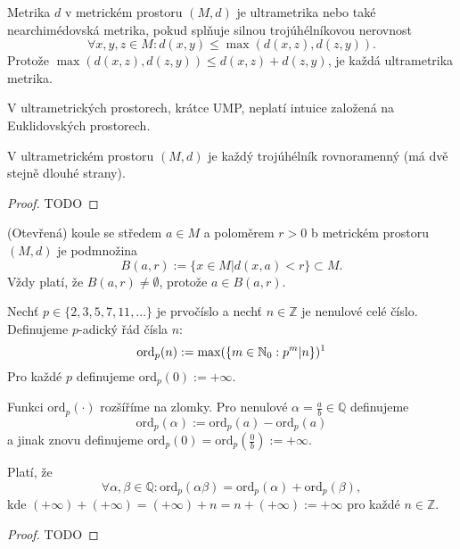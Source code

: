 \documentclass[../main.tex]{subfiles}
\begin{document}
\begin{definition}[Ultrametrika]
    Metrika $d$ v metrickém prostoru $(M,d)$ je ultrametrika nebo také nearchimédovská metrika, pokud
    splňuje silnou trojúhélníkovou nerovnost
    \[ \forall x,y,z \in M: d(x,y) \leq \max(d(x,z), d(z,y)). \]
    Protože $\max(d(x,z),d(z,y)) \leq d(x,z) + d(z,y)$, je každá ultrametrika metrika.
\end{definition}

\begin{remark}
    V ultrametrických prostorech, krátce UMP, neplatí intuice založená na Euklidovských prostorech.
\end{remark}

\begin{lemma}
    V ultrametrickém prostoru $(M,d)$ je každý trojúhélník rovnoramenný (má dvě stejně dlouhé strany).
\end{lemma}
\begin{proof}
    TODO
\end{proof}

\begin{definition}[Koule]
    (Otevřená) koule se středem $a \in M$ a poloměrem $r>0$ b metrickém prostoru $(M,d)$
    je podmnožina
    \[ B(a,r) := \{ x \in M | d(x,a) < r \} \subset M. \]
    Vždy platí, že $B(a,r) \neq \emptyset$, protože $a \in B(a,r)$.
\end{definition}

\begin{example}
    Nechť $p \in \{ 2,3,5,7,11,\dots \}$ je prvočíslo a nechť $n \in \mathbb{Z}$
    je nenulové celé číslo. Definujeme $p$-adický řád čísla $n$:
    \[ \textrm{ord}_p(n) := \max(\{ m \in \mathbb{N}_0 : p^m | n \})\text{\footnotemark} \]
    Pro každé $p$ definujeme $\textrm{ord}_p(0) := +\infty$.

    Funkci $\textrm{ord}_p(\cdot)$ rozšíříme na zlomky.
    Pro nenulové $\alpha = \frac{a}{b} \in \mathbb{Q}$ definujeme
    \[ \text{ord}_p(\alpha) := \text{ord}_p(a) - \text{ord}_p(a) \]
    a jinak znovu definujeme $\text{ord}_p(0) = \text{ord}_p(\frac{0}{b}) := +\infty$.
\end{example}

\begin{lemma}
    Platí, že \[ \forall \alpha ,\beta \in \mathbb{Q}:
    \text{ord}_p(\alpha \beta) = \text{ord}_p(\alpha) + \text{ord}_p(\beta), \]
    kde $(+\infty) + (+\infty) = (+\infty) + n = n + (+\infty) := +\infty$ pro každé $n \in \mathbb{Z}$.
\end{lemma}
\begin{proof}
    TODO
\end{proof}
\end{document}
